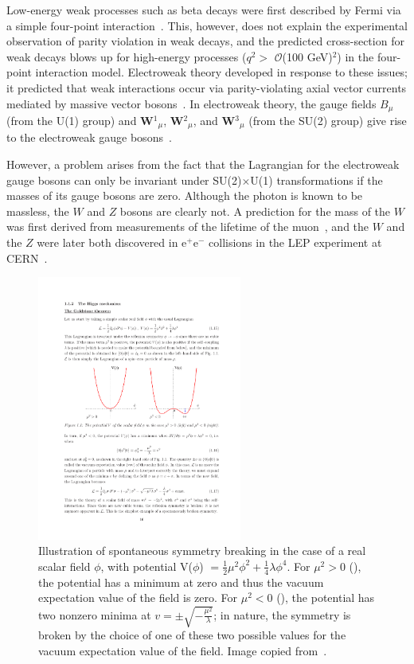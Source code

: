Low-energy weak processes such as beta decays were first described by Fermi via a simple four-point interaction~\cite{0034-4885-42-12-001}. This, however, does not explain the experimental observation of parity violation in weak decays, and the predicted cross-section for weak decays blows up for high-energy processes ($q^2 >$ $\mathcal{O}$(100 GeV)$^2$) in the four-point interaction model. Electroweak theory developed in response to these issues; it predicted that weak interactions occur via parity-violating axial vector currents mediated by massive vector bosons~\cite{PerkinsPhysics}. In electroweak theory, the gauge fields $B_{\mu}$ (from the U(1) group) and \textbf{W}$^1$$_{\mu}$, \textbf{W}$^2$$_{\mu}$, and \textbf{W}$^3$$_{\mu}$ (from the SU(2) group) give rise to the electroweak gauge bosons~\cite{Bednyakov:2007pz}.

However, a problem arises from the fact that the Lagrangian for the electroweak gauge bosons can only be invariant under SU(2)$\times$U(1) transformations if the masses of its gauge bosons are zero. Although the photon is known to be massless, the $W$ and $Z$ bosons are clearly not. A prediction for the mass of the $W$ was first derived from measurements of the lifetime of the muon~\cite{ThomsonPhysics}, and the $W$ and the $Z$ were later both discovered in e$^{+}$e$^{-}$ collisions in the LEP experiment at CERN~\cite{Arnison:1983rp,Arnison:1983mk}.

\begin{figure}
   \begin{center}
      \includegraphics[width=0.6\textwidth]{figures/intro-Higgspotential}
      \caption{Illustration of spontaneous symmetry breaking in the case of a real scalar field $\phi$, with potential V($\phi$) $= \frac{1}{2}\mu^2\phi^2 + \frac{1}{4}\lambda\phi^4$. For $\mu^2 > 0$ (\cmsLeft), the potential has a minimum at zero and thus the vacuum expectation value of the field is zero. For $\mu^2 < 0$ (\cmsRight), the potential has two nonzero minima at $v = \pm\sqrt{-\frac{\mu^2}{\lambda}}$; in nature, the symmetry is broken by the choice of one of these two possible values for the vacuum expectation value of the field. Image copied from~\cite{Djouadi:2005gi}.}
      \label{fig:higgspotential}
   \end{center}
\end{figure}

